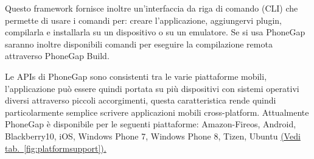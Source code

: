 			Questo framework fornisce inoltre un'interfaccia da riga di comando (CLI)
			che permette di usare i comandi per: creare l'applicazione, aggiungervi 
			plugin, compilarla e installarla su un dispositivo o su un emulatore. 
			Se si usa PhoneGap saranno inoltre disponibili comandi per eseguire 
			la compilazione remota attraverso PhoneGap Build.
			
			Le APIs di PhoneGap sono consistenti tra le varie piattaforme mobili, 
			l'applicazione può essere quindi portata su più dispositivi con 
			sistemi operativi diversi attraverso piccoli accorgimenti, questa 
			caratteristica rende quindi particolarmente semplice scrivere 
			applicazioni mobili cross-platform.
			Attualmente PhoneGap è disponibile per le seguenti piattaforme: 
			Amazon-Fireos, Android, Blackberry10, iOS, Windows Phone 7, 
			Windows Phone 8, Tizen, Ubuntu \hyperref[fig:platformsupport]{(Vedi 
			tab.~\ref{fig:platformsupport}).}
